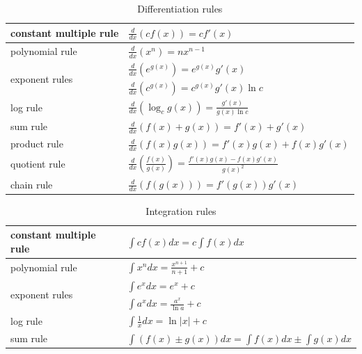 \clearpage

 \begin{table}
 \caption{Differentiation rules}
\footnotesize
 \vspace{1em} 
 \begin{center}
 \begin{tabularx}{0.9\textwidth}{|l|X|}
 \hline
 constant multiple rule & $\frac{d}{dx}\left(cf\left(x\right)\right) = cf'\left(x\right)$\\\hline
polynomial rule &$\frac{d}{dx}\left(x^n\right) = nx^{n-1}$\\\hline
\multirow{2}{*}{exponent rules} & $\frac{d}{dx}\left(e^{g(x)}\right) = e^{g(x)}g'(x)$\\
 & $\frac{d}{dx}\left(c^{g(x)}\right) = c^{g(x)}g'(x)\ln c$\\\hline
 log rule & $\frac{d}{dx}\left(\log_c g\left(x\right)\right) = \frac{g'(x)}{g(x)\ln c}$\\\hline
 sum rule & $\frac{d}{dx}\left(f\left(x\right) + g\left(x\right)\right) = f'(x) + g'(x)$\\\hline
 product rule & $\frac{d}{dx}\left(f\left(x\right)g\left(x\right)\right) = f'(x)g(x) + f(x)g'(x)$\\\hline
 quotient rule & $\frac{d}{dx}\left(\frac{f(x)}{g(x)}\right) = \frac{f'(x)g(x)-f(x)g'(x)}{g(x)^2}$\\\hline
 chain rule & $\frac{d}{dx}\left(f\left(g\left(x\right)\right)\right) = f'\left(g\left(x\right)\right)g'(x)$\\\hline
 \end{tabularx}
 \end{center}
\end{table}
 \begin{table}
 \caption{Integration rules} 
\vspace{1em} \begin{center}
\footnotesize
 \begin{tabularx}{0.9\textwidth}{|l|X|}
 \hline
 constant multiple rule & $\int cf\left(x\right) dx = c\int f(x) dx$\\\hline
polynomial rule &$\int x^n dx = \frac{x^{n+1}}{n+1} + c$\\\hline
\multirow{2}{*}{exponent rules} & $\int e^{x} dx = e^{x}+c$\\
 & $\int a^x dx = \frac{a^x}{\ln a} + c$\\\hline
 log rule & $\int \frac{1}{x} dx = \ln |x| + c$\\\hline
 sum rule & $\int\left(f(x)\pm g(x)\right) dx  = \int f(x) dx \pm \int g(x) dx$\\\hline
 \end{tabularx}
 \end{center}
\end{table}


